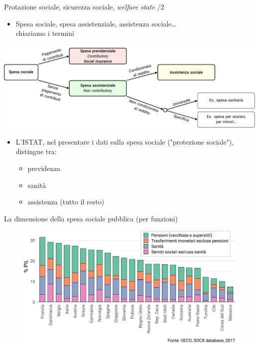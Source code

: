 \documentclass[aspectratio=149,11pt]{beamer}
\begin{document}
\begin{frame}{Protazione sociale, sicurezza sociale, \emph{welfare state} /2}
\begin{itemize}
\item Spesa sociale, spesa assistenziale, assistenza sociale\ldots{}\\[0pt]
chiariamo i termini
\end{itemize}

\begin{center}
\includegraphics[width=\linewidth]{./figure/spesa-sociale-classificazione.pdf}
\end{center}

\begin{itemize}
\item L'ISTAT, nel presentare i dati sulla spesa sociale ("protezione sociale"), distingue tra:
\begin{itemize}
\item previdenza
\item sanità
\item assistenza (tutto il resto)
\end{itemize}
\end{itemize}
\end{frame}

\begin{frame}{La dimensione della spesa sociale pubblica (per funzioni)}
\begin{figure}[htbp]
\centering
\includegraphics[width=.95\textwidth]{./figure/spesa-sociale-lorda-per-aree-principali-color.pdf}
\end{figure}
\end{frame}
\end{document}
